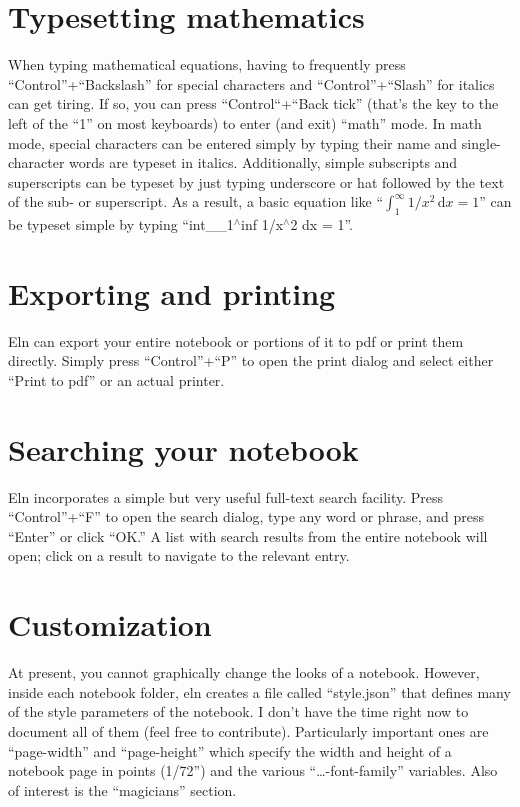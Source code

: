 \documentclass[11pt]{report}
\begin{document}
\section{Typesetting mathematics}

When typing mathematical equations, having to frequently press
``Control''+``Backslash'' for special characters and
``Control''+``Slash'' for italics can get tiring. If so, you can press
``Control``+``Back tick'' (that's the key to the left of the ``1'' on
most keyboards) to enter (and exit) ``math'' mode. In math mode,
special characters can be entered simply by typing their name and
single-character words are typeset in italics. Additionally, simple
subscripts and superscripts can be typeset by just typing underscore
or hat followed by the text of the sub- or superscript. As a result, a
basic equation like ``$\int_1^\infty 1/x^2\, \mathrm{d}x = 1$'' can be typeset simple
by typing ``int\_$\!$\_1$^\wedge$inf 1/x$^\wedge$2 dx = 1''.

\section{Exporting and printing}

Eln can export your entire notebook or portions of it to pdf or print
them directly. Simply press ``Control''+``P'' to open the print dialog
and select either ``Print to pdf'' or an actual printer.

\section{Searching your notebook}

Eln incorporates a simple but very useful full-text search
facility. Press ``Control''+``F'' to open the search dialog, type any
word or phrase, and press ``Enter'' or click ``OK.'' A list with
search results from the entire notebook will open; click on a result
to navigate to the relevant entry.

\section{Customization}

At present, you cannot graphically change the looks of a
notebook. However, inside each notebook folder, eln creates a file
called ``style.json'' that defines many of the style parameters of the
notebook. I don't have the time right now to document all of them
(feel free to contribute). Particularly important ones are
``page-width'' and ``page-height'' which specify the width and height
of a notebook page in points (1/72'') and the various
``\ldots-font-family'' variables. Also of interest is the
``magicians'' section.
\end{document}
